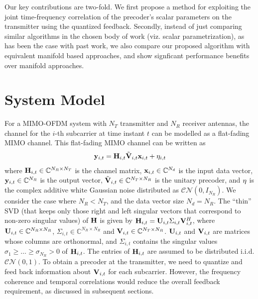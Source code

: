 \documentclass[journal,10pt,twocolumn]{IEEEtran}
\def\bx{{\bf x}}
\def\by{{\bf y}}
\def\bH{{\bf H}}
\def\bU{{\bf U}}
\def\bV{{\bf V}}
\begin{document}
Our key contributions are two-fold.  We first propose a method for exploiting the
joint time-frequency correlation of the precoder's scalar parameters
on the transmitter using the quantized feedback.
Secondly, instead of just comparing similar algorithms in the chosen body of work (viz. scalar parametrization), as has been the case with past work, we also compare our proposed algorithm with equivalent manifold based approaches, and show signficant performance benefits over manifold approaches.



\section{System Model}
For a MIMO-OFDM system with $N_T$ transmitter and $N_R$ receiver
antennas, the channel for the $i$-th subcarrier at time instant $t$
can be modelled as a flat-fading MIMO channel. This flat-fading MIMO
channel can be written as
\label{section2}
\begin{equation}
\by_{i,t} = \bH_{i,t}\tilde{\bV}_{i,t} \bx_{i,t}+ {\bf{\eta}}_{i,t}
\end{equation}
where $\bH_{i,t} \in \mathbb{C}^{N_R \times N_T}$ is the channel
matrix, $\bx_{i,t} \in \mathbb{C}^{N_d}$ is the input data vector,
$\by_{i,t} \in \mathbb{C}^{N_R}$ is the output vector,
$\tilde{\bV}_{i,t} \in \mathbb{C}^{N_T \times N_R}$ is the unitary
precoder, and $\bf{\eta}$ is the complex additive white Gaussian noise
distributed as ${\mathcal{CN}}(0,I_{N_R})$. We consider the case where
$N_R < N_T$, and the data vector size $N_d = N_R$.  The ``thin'' SVD
(that keeps only those right and left singular vectors that correspond
to non-zero singular values) of $\bH$ is given by
$\bH_{i,t} = \bU_{i,t} \Sigma_{i,t} \bV_{i,t}^{H}$, where
$\bU_{i,t} \in \mathbb{C}^{N_R \times N_R}$,
$\Sigma_{i,t} \in \mathbb{C}^{N_R \times N_R}$ and
$\bV_{i,t} \in \mathbb{C}^{N_T \times N_R}$. $\bU_{i,t}$ and
$\bV_{i,t}$ are matrices whose columns are orthonormal, and
$\Sigma_{i,t}$ contains the singular values
$\sigma_1 \geq \ldots \geq \sigma_{N_R} > 0$ of $\bH_{i,t}$. The
entries of $\bH_{i,t}$ are assumed to be distributed
i.i.d. $\mathcal{CN}(0,1)$. To obtain a precoder at the
transmitter, we need to quantize and feed back information about
$\bV_{i,t}$ for each subcarrier. However, the frequency coherence and
temporal correlations would reduce the overall feedback requirement,
as discussed in subsequent sections.
\end{document}
